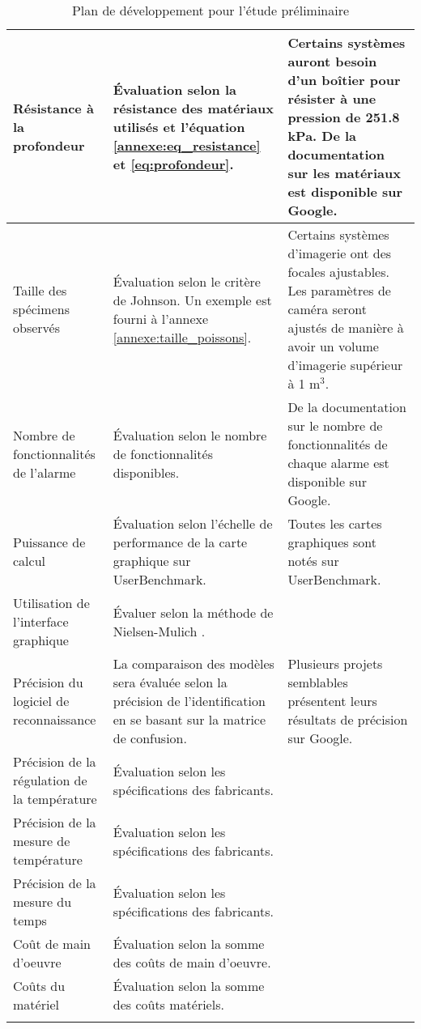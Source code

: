 \begin{longtable}[c]{|p{2.5cm}|p{6cm}|p{6cm}|}
        Résistance à la profondeur & Évaluation selon la résistance des matériaux utilisés et l'équation \ref{annexe:eq_resistance} et \ref{eq:profondeur}. & Certains systèmes auront besoin d'un boîtier pour résister à une pression de 251.8 kPa. De la documentation sur les matériaux est disponible sur Google. \\\hline
        Taille des spécimens observés & Évaluation selon le critère de Johnson. Un exemple est fourni à l'annexe \ref{annexe:taille_poissons}. & Certains systèmes d'imagerie ont des focales ajustables. Les paramètres de caméra seront ajustés de manière à avoir un volume d'imagerie supérieur à 1 m$^3$. \\\hline
        Nombre de fonctionnalités de l'alarme  & Évaluation selon le nombre de fonctionnalités disponibles. & De la documentation sur le nombre de fonctionnalités de chaque alarme est disponible sur Google. \\\hline
        Puissance de calcul & Évaluation selon l'échelle de performance de la carte graphique sur UserBenchmark. & Toutes les cartes graphiques sont notés sur UserBenchmark. \\\hline
        Utilisation de l'interface graphique  & Évaluer selon la méthode de Nielsen-Mulich \cite{nielsen}. & \\
        \hline\hline
        Précision du logiciel de reconnaissance & La comparaison des modèles sera évaluée selon la précision de l'identification en se basant sur la matrice de confusion. & Plusieurs projets semblables présentent leurs résultats de précision sur Google. \\\hline
        Précision de la régulation de la température & Évaluation selon les spécifications des fabricants. &  \\\hline
        Précision de la mesure de température & Évaluation selon les spécifications des fabricants. & \\\hline
        Précision de la mesure du temps & Évaluation selon les spécifications des fabricants. & \\
        \hline\hline
        Coût de main d'oeuvre & Évaluation selon la somme des coûts de main d'oeuvre. & \\\hline
        Coûts du matériel & Évaluation selon la somme des coûts matériels. & \\
        \hline
\caption{Plan de développement pour l'étude préliminaire}
\label{t:plan_dev}
\end{longtable}

